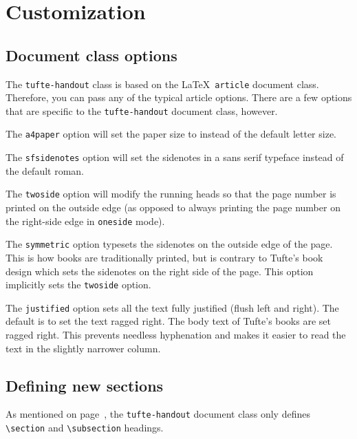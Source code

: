 \documentclass{tufte-handout}
\begin{document}
\section{Customization}\label{sec:customization}
\subsection{Document class options}\label{sec:options}
The \Verb|tufte-handout| class is based on the \LaTeX\ \Verb|article|
document class.  Therefore, you can pass any of the typical article
options.  There are a few options that are specific to the
\Verb|tufte-handout| document class, however.

The \Verb|a4paper| option will set the paper size to  instead of
the default  letter size.

The \Verb|sfsidenotes| option will set the sidenotes in a \textsf{sans
serif} typeface instead of the default roman.

The \Verb|twoside| option will modify the running heads so that the page
number is printed on the outside edge (as opposed to always printing the page
number on the right-side edge in \Verb|oneside| mode).  

The \Verb|symmetric| option typesets the sidenotes on the outside edge of
the page.  This is how books are traditionally printed, but is contrary to
Tufte's book design which sets the sidenotes on the right side of the page.
This option implicitly sets the \Verb|twoside| option.

The \Verb|justified| option sets all the text fully justified (flush left
and right).  The default is to set the text ragged right.  
The body text of Tufte's books are set ragged right.  This prevents
needless hyphenation and makes it easier to read the text in the slightly
narrower column.

\subsection{Defining new sections}\label{sec:defining-sections}
As mentioned on page~\pageref{sec:headings}, the \Verb|tufte-handout|
document class only defines \Verb|\section| and \Verb|\subsection|
headings.  
\end{document}
